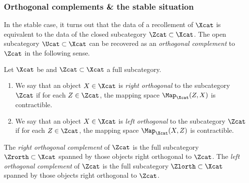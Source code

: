 
\subsubsection{Orthogonal complements \& the stable situation} 

In the stable case, it turns out that the data of a recollement of $ \Xcat $ is equivalent to the data of the closed subcategory $ \Zcat \subset \Xcat $.
The open subcategory $ \Ucat \subset \Xcat $ can be recovered as an \textit{orthogonal complement} to $ \Zcat $ in the following sense.

\begin{definition}\label{def:orthogonal}
	Let $ \Xcat $ be \acategory and $ \Zcat \subset \Xcat $ a full subcategory.
	\begin{enumerate}
		\item We say that an object $ X \in \Xcat $ is \textit{right orthogonal} to the subcategory $ \Zcat $ if for each $ Z \in \Zcat $, the mapping space 
		$ \Map_{\Xcat}(Z,X) $ is contractible.

		\item We say that an object $ X \in \Xcat $ is \textit{left orthogonal} to the subcategory $ \Zcat $ if for each $ Z \in \Zcat $, the mapping space 
		$ \Map_{\Xcat}(X,Z) $ is contractible.
	\end{enumerate} 
	The \textit{right orthogonal complement} of $ \Zcat $ is the full subcategory $ \Zrorth \subset \Xcat $ spanned by those objects right orthogonal to $ \Zcat $.
	The \textit{left orthogonal complement} of $ \Zcat $ is the full subcategory $ \Zlorth \subset \Xcat $ spanned by those objects right orthogonal to $ \Zcat $.
\end{definition}

